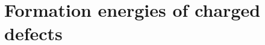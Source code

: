 \newcommand{\Fupr}{\text{F}}
\newcommand{\qupr}{\text{q}}
\newcommand{\coreupr}{\text{core}}
\newcommand{\VBMupr}{\text{VBM}}
\newcommand{\Cupr}{\text{C}}
\newcommand{\Nupr}{\text{N}}
\newcommand{\Hupr}{\text{H}}
\newcommand{\Oupr}{\text{O}}
\newcommand{\Mgupr}{\text{Mg}}
\newcommand{\MgOupr}{\text{MgO}}
\newcommand{\fupr}{\text{f}}
\newcommand{\Dupr}{\text{D}}
\newcommand{\perfupr}{\text{perf}}
\newcommand{\totupr}{\text{tot}}
\newcommand{\atomupr}{\text{atom}}
\newcommand{\Vupr}{\text{V}}
\newcommand{\bulkupr}{\text{bulk}}
\newcommand{\gasupr}{\text{gas}}
\newcommand{\Gupr}{\text{G}}
\newcommand{\Eupr}{\text{E}}
\newcommand{\iupr}{\text{i}}
\newcommand{\eps}{\varepsilon}



\section{Formation energies of charged defects}
\label{appendix_charged_defects}


